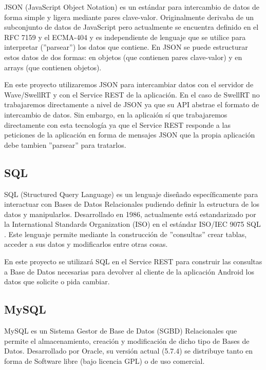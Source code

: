 	JSON \cite{ref:json} (JavaScript Object Notation) es un estándar para intercambio de datos de forma simple y ligera mediante pares clave-valor. Originalmente derivaba de un subconjunto de datos de JavaScript pero actualmente se encuentra definido en el RFC 7159 y el ECMA-404 y es independiente de lenguaje que se utilice para interpretar (''parsear'') los datos que contiene. En JSON se puede estructurar estos datos de dos formas: en objetos (que contienen pares clave-valor) y en arrays (que contienen objetos).
	
	En este proyecto utilizaremos JSON para intercambiar datos con el servidor de Wave/SwellRT y con el Service REST de la aplicación. En el caso de SwellRT no trabajaremos directamente a nivel de JSON ya que su API abstrae el formato de intercambio de datos. Sin embargo, en la aplicaión sí que trabajaremos directamente con esta tecnología ya que el Service REST responde a las peticiones de la aplicación en forma de mensajes JSON que la propia aplicación debe tambien ''parsear'' para tratarlos.    
    
    \subsection{SQL}\label{ssec:sql}
    
	SQL \cite{ref:sql} (Structured Query Language) es un lenguaje diseñado específicamente para interactuar con Bases de Datos Relacionales pudiendo definir la estructura de los datos y manipularlos. Desarrollado en 1986, actualmente está estandarizado por la International Standards Organization (ISO) en el estándar ISO/IEC 9075 SQL \cite{ref:sql}. Este lenguaje permite mediante la construcción de ''consultas'' crear tablas, acceder a sus datos y modificarlos entre otras cosas.
	
	En este proyecto se utilizará SQL en el Service REST para construir las consultas a Base de Datos necesarias para devolver al cliente de la aplicación Android los datos que solicite o pida cambiar.  
    
    \subsection{MySQL}\label{ssec:mysql}
    
	MySQL \cite{ref:mysql} es un Sistema Gestor de Base de Datos (SGBD) Relacionales que permite el almacenamiento, creación y modificación de dicho tipo de Bases de Datos. Desarrollado por Oracle, su versión actual (5.7.4) se distribuye tanto en forma de Software libre (bajo licencia GPL) o de uso comercial.     
	
